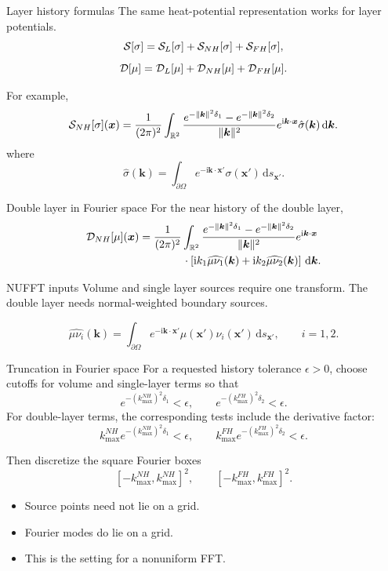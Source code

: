\documentclass[aspectratio=169,11pt]{beamer}
\newcommand{\R}{\mathbb{R}}
\newcommand{\dd}{\,\mathrm d}
\newcommand{\ii}{\mathrm i}
\newcommand{\x}{\bm{x}}
\newcommand{\xp}{\bm{x}'}
\newcommand{\kvec}{\bm{k}}
\begin{document}
\begin{frame}{Layer history formulas}
\small
The same heat-potential representation works for layer potentials.
\[
  \mathcal{S}[\sigma]=\mathcal{S}_L[\sigma]+\mathcal{S}_{NH}[\sigma]+\mathcal{S}_{FH}[\sigma],
\]
\[
  \mathcal{D}[\mu]=\mathcal{D}_L[\mu]+\mathcal{D}_{NH}[\mu]+\mathcal{D}_{FH}[\mu].
\]

For example,
\[
  \Sop_{NH}[\sigma](\x)=
  \frac{1}{(2\pi)^2}
  \int_{\R^2}
  \frac{e^{-\|\kvec\|^2\delta_1}-e^{-\|\kvec\|^2\delta_2}}
       {\|\kvec\|^2}
  e^{\ii\kvec\cdot\x}\hat\sigma(\kvec)\dd\kvec.
\]
where
\[
  \hat\sigma(\kvec)=
  \int_{\partial\Omega}e^{-\ii\kvec\cdot\xp}\sigma(\xp)\dd s_{\xp}.
\]
\end{frame}

\begin{frame}{Double layer in Fourier space}
\small
For the near history of the double layer,
\[
\begin{aligned}
\Dop_{NH}[\mu](\x)
&=
\frac{1}{(2\pi)^2}
\int_{\R^2}
\frac{e^{-\|\kvec\|^2\delta_1}-e^{-\|\kvec\|^2\delta_2}}
     {\|\kvec\|^2}
e^{\ii\kvec\cdot\x} \\
&\qquad\qquad\cdot
\left[
\ii k_1\widehat{\mu\nu_1}(\kvec)
+\ii k_2\widehat{\mu\nu_2}(\kvec)
\right]\dd\kvec.
\end{aligned}
\]

\begin{block}{NUFFT inputs}
Volume and single layer sources require one transform. The double layer needs
normal-weighted boundary sources.
\end{block}

\[
  \widehat{\mu\nu_i}(\kvec)=
  \int_{\partial\Omega}e^{-\ii\kvec\cdot\xp}
  \mu(\xp)\nu_i(\xp)\dd s_{\xp},\qquad i=1,2.
\]
\end{frame}

\begin{frame}{Truncation in Fourier space}
\small
For a requested history tolerance $\epsilon>0$, choose cutoffs for volume and
single-layer terms so that
\[
  e^{-(k^{NH}_{\max})^2\delta_1}<\epsilon,
  \qquad
  e^{-(k^{FH}_{\max})^2\delta_2}<\epsilon.
\]
For double-layer terms, the corresponding tests include the derivative factor:
\[
  k^{NH}_{\max}e^{-(k^{NH}_{\max})^2\delta_1}<\epsilon,
  \qquad
  k^{FH}_{\max}e^{-(k^{FH}_{\max})^2\delta_2}<\epsilon.
\]

Then discretize the square Fourier boxes
\[
  [-k^{NH}_{\max},k^{NH}_{\max}]^2,
  \qquad
  [-k^{FH}_{\max},k^{FH}_{\max}]^2.
\]

\begin{itemize}
  \item Source points need not lie on a grid.
  \item Fourier modes do lie on a grid.
  \item This is the setting for a nonuniform FFT.
\end{itemize}
\end{frame}
\end{document}
